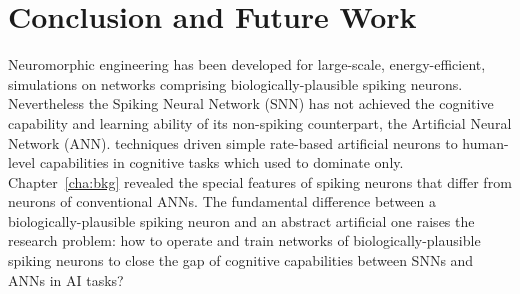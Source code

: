 \chapter{Conclusion and Future Work}
\label{cha:conc}
Neuromorphic engineering has been developed for large-scale, energy-efficient, simulations on networks comprising \protect{} biologically-plausible spiking neurons.
Nevertheless the Spiking Neural Network (SNN) has not achieved the cognitive capability and learning ability of its non-spiking counterpart, the Artificial Neural Network (ANN).
\protect{}
\protect{} techniques \protect{} \protect{} driven simple rate-based artificial neurons to \protect{} \protect{} human-level capabilities in cognitive tasks which \protect{} \protect{} used to dominate only. 
\protect{} 
Chapter~\ref{cha:bkg} \protect{} revealed the special features of spiking neurons that differ from \protect{} neurons of conventional ANNs.
The fundamental difference between a biologically-plausible spiking neuron and an abstract artificial one raises the research problem: how to operate and train networks of biologically-plausible spiking neurons to close the gap of cognitive capabilities between SNNs and ANNs in AI tasks?

